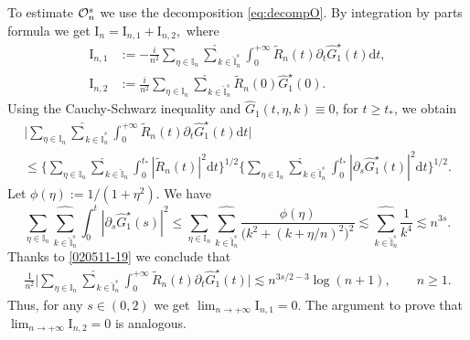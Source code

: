 \documentclass[EJP]{ejpecp} %
\newcommand\T{{\mathbb I}}
\renewcommand{\ge}{\geqslant}
\renewcommand{\le}{\leqslant}
\newcommand{\dd  }{\mathrm{d}}
\renewcommand{\hat}{\widehat}
\renewcommand{\tilde}{\widetilde}
\numberwithin{equation}{section}
\begin{document}
To estimate ${\cal O}_{n}^s$ we use the decomposition \eqref{eq:decompO}.
By integration by parts formula we get
$
\mathrm{I}_n=\mathrm{I}_{n,1}+\mathrm{I}_{n,2},
$
where
\begin{align*}
\mathrm{I}_{n,1}&:=-\frac{i}{n^2}\sum_{\eta\in\T_n}\underset{{k\in \widehat{\T}_n^s}}{{\hat\sum}}\int_0^{+\infty} \tilde R_n(t)
\partial_t \hat G^\star_1(t)
\dd t,\\
\mathrm{I}_{n,2}&:=\frac{i}{n^2}\sum_{\eta\in\T_n}\underset{{k\in \widehat{\T}_n^s}}{{\hat\sum}}\tilde R_n(0)\hat
G^\star_1(0).
\end{align*}
Using the Cauchy-Schwarz inequality and $\hat
G_1(t,\eta,k)\equiv 0$, for $t\ge t_*$,  we obtain
\begin{multline*}\bigg|\sum_{\eta\in\T_n}\underset{{k\in \widehat{\T}_n^s}}{{\hat\sum}}\int_0^{+\infty} \tilde R_n(t)
\partial_t \hat G^\star_1(t)\dd t\bigg|
\\
\le \bigg\{\sum_{\eta\in\T_n}\underset{{k\in \widehat{\T}_n}}{{\hat\sum}}\int_0^{t_*}\left|\tilde R_n(t)
  \right|^2\dd t\bigg\}^{1/2}\bigg\{\sum_{\eta\in\T_n}\underset{{k\in \widehat{\T}_n^s}}{{\hat\sum}}\int_0^{t_*}\left|\partial_s \hat G^\star_1(t)
  \right|^2\dd t\bigg\}^{1/2}.
\end{multline*}
Let
$
\phi(\eta):=1/(1+\eta^2).
$
We have
\begin{equation}
\label{012211-19}
\sum_{\eta\in\T_n}\underset{{k\in \widehat{\T}_n^s}}{{\hat\sum}}\int_0^t\left|\partial_s \hat G^\star_1(s)
  \right|^2
\le \sum_{\eta\in\T_n}\underset{{k\in \widehat{\T}_n^s}}{{\hat\sum}}\frac{\phi(\eta)}{\big(k^2+(k+\eta/n)^2\big)^2}\lesssim \underset{{k\in \widehat{\T}_n^s}}{{\hat\sum}}\frac{1}{k^4}
\lesssim  n^{3s}.
\end{equation}
Thanks to \eqref{020511-19} we conclude that
\begin{align*}
\frac{1}{n^2}\bigg|\sum_{\eta\in\T_n}\underset{{k\in \widehat{\T}_n^s}}{{\hat\sum}}\int_0^{+\infty} \tilde R_n(t)
\partial_t \hat G^\star_1(t)\bigg|
\lesssim n^{3s/2-3}\log( n+1),\qquad n\ge1.
\end{align*}
Thus, for any $s\in(0,2)$ we get 
$
\lim_{n\to+\infty}\mathrm{I}_{n,1}=0.
$
The argument to prove that $\lim_{n\to+\infty}\mathrm{I}_{n,2}=0$ is analogous.
\end{document}
